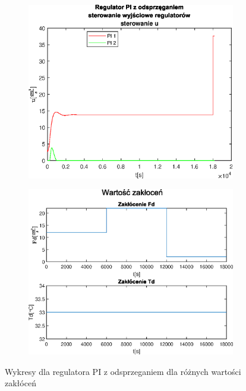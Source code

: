 \begin{figure}[h!]
   \begin{subfigure}[b]{0.4\textwidth}
      \includegraphics[width=1\linewidth]{img/PI/decoupler/disturbance/PIDecouplerControlD1.eps}
      \caption{}
      \label{fig:fig:PIDecoupler13}
   \end{subfigure}
       
   \begin{subfigure}[b]{0.4\textwidth}
      \includegraphics[width=1\linewidth]{img/PI/decoupler/disturbance/PIDecouplerDisturbance1.eps}
      \caption{}
      \label{fig:fig:PIDecoupler14}
   \end{subfigure}
       
   \caption{Wykresy dla regulatora PI z odsprzeganiem dla różnych wartości zakłóceń}
   \label{fig:PIDecoupler1}
\end{figure}
           
